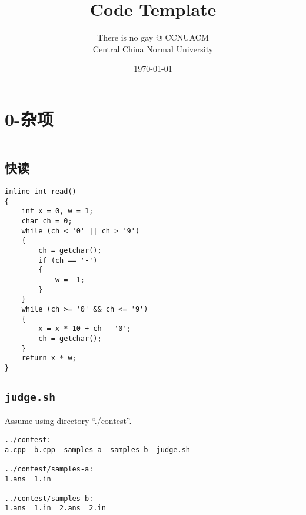 \documentclass[]{article}
\date{}
\title{\vspace{50mm} \huge Code Template \\[20pt]}
\author{There is no gay @ CCNUACM \\[10pt] Central China Normal University}
\date{\today}
\begin{document}
\begin{titlepage}

\maketitle

\end{titlepage}

\newpage

\renewcommand\labelitemi{$\bullet$}

{
\setcounter{tocdepth}{3}
\tableofcontents
\newpage
}








\hypertarget{ux6742ux9879}{%
\section{0-杂项}\label{ux6742ux9879}}

\begin{center}\rule{0.5\linewidth}{0.5pt}\end{center}

\hypertarget{ux5febux8bfb}{%
\subsection{快读}\label{ux5febux8bfb}}

\begin{verbatim}
inline int read()
{
    int x = 0, w = 1;
    char ch = 0;
    while (ch < '0' || ch > '9')
    {
        ch = getchar();
        if (ch == '-')
        {
            w = -1;
        }
    }
    while (ch >= '0' && ch <= '9')
    {
        x = x * 10 + ch - '0';
        ch = getchar();
    }
    return x * w;
}
\end{verbatim}

\hypertarget{judge.sh}{%
\subsection{\texorpdfstring{\texttt{judge.sh}}{judge.sh}}\label{judge.sh}}

Assume using directory ``./contest''.

\begin{verbatim}
../contest:
a.cpp  b.cpp  samples-a  samples-b  judge.sh

../contest/samples-a:
1.ans  1.in

../contest/samples-b:
1.ans  1.in  2.ans  2.in
\end{verbatim}
\end{document}
